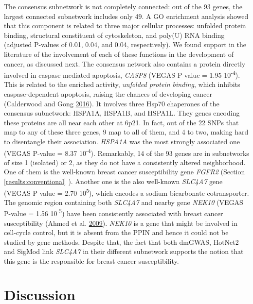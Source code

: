 \documentclass[
  11pt,
]{env/yjiao}
\begin{document}
The consensus subnetwork is not completely connected: out of the 93
genes, the largest connected subnetwork includes only 49. A GO
enrichment analysis showed that this component is related to three major
cellular processes: unfolded protein binding, structural constituent of
cytoskeleton, and poly(U) RNA binding (adjusted P-values of 0.01, 0.04,
and 0.04, respectively). We found support in the literature of the
involvement of each of these functions in the development of cancer, as
discussed next. The consensus network also contains a protein directly
involved in caspase-mediated apoptosis, \emph{CASP8} (VEGAS P-value = 1.95
10\textsuperscript{-4}). This is related to the enriched activity, \emph{unfolded protein
binding}, which inhibits caspase-dependent apoptosis, raising the
chances of developing cancer (Calderwood and Gong \protect\hyperlink{ref-calderwood_heat_2016}{2016}). It involves three
Hsp70 chaperones of the consensus subnetwork: HSPA1A, HSPA1B, and
HSPA1L. They genes encoding these proteins are all near each other at
6p21. In fact, out of the 22 SNPs that map to any of these three genes,
9 map to all of them, and 4 to two, making hard to disentangle their
association. \emph{HSPA1A} was the most strongly associated one (VEGAS P-value
= 8.37 10\textsuperscript{-4}). Remarkably, 14 of the 93 genes are in subnetworks of
size 1 (isolated) or 2, as they do not have a consistently altered
neighborhood. One of them is the well-known breast cancer susceptibility
gene \emph{FGFR2} (Section \ref{results:conventional}
). Another one is the also well-known
\emph{SLC4A7} gene (VEGAS P-value = 2.70 10\textsuperscript{5}), which encodes a sodium
bicarbonate cotransporter. The genomic region containing both \emph{SLC4A7}
and nearby gene \emph{NEK10} (VEGAS P-value = 1.56 10\textsuperscript{-5}) have been
consistently associated with breast cancer susceptibility
(Ahmed et al. \protect\hyperlink{ref-search_newly_2009}{2009}). \emph{NEK10} is a gene that might be involved in
cell-cycle control, but it is absent from the PPIN and hence it could
not be studied by gene methods. Despite that, the fact that both dmGWAS,
HotNet2 and SigMod link \emph{SLC4A7} in their different subnetwork supports
the notion that this gene is the responsible for breast cancer
susceptibility.

\hypertarget{genewa-discussion}{%
\section{Discussion}\label{genewa-discussion}}
\end{document}
